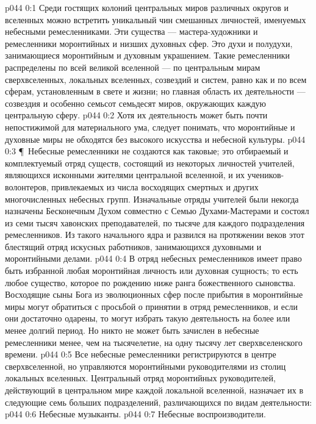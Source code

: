 \author{Архангел}
\vs p044 0:1 Среди гостящих колоний центральных миров различных округов и вселенных можно встретить уникальный чин смешанных личностей, именуемых небесными ремесленниками. Эти существа --- мастера\hyp{}художники и ремесленники моронтийных и низших духовных сфер. Это духи и полудухи, занимающиеся моронтийным и духовным украшением. Такие ремесленники распределены по всей великой вселенной --- по центральным мирам сверхвселенных, локальных вселенных, созвездий и систем, равно как и по всем сферам, установленным в свете и жизни; но главная область их деятельности --- созвездия и особенно семьсот семьдесят миров, окружающих каждую центральную сферу.
\vs p044 0:2 Хотя их деятельность может быть почти непостижимой для материального ума, следует понимать, что моронтийные и духовные миры не обходятся без высокого искусства и небесной культуры.
\vs p044 0:3 \P\ Небесные ремесленники не создаются как таковые; это отбираемый и комплектуемый отряд существ, состоящий из некоторых личностей учителей, являющихся исконными жителями центральной вселенной, и их учеников\hyp{}волонтеров, привлекаемых из числа восходящих смертных и других многочисленных небесных групп. Изначальные отряды учителей были некогда назначены Бесконечным Духом совместно с Семью Духами\hyp{}Мастерами и состоял из семи тысяч хавонских преподавателей, по тысяче для каждого подразделения ремесленников. Из такого начального ядра и развился на протяжении веков этот блестящий отряд искусных работников, занимающихся духовными и моронтийными делами.
\vs p044 0:4 В отряд небесных ремесленников имеет право быть избранной любая моронтийная личность или духовная сущность; то есть любое существо, которое по рождению ниже ранга божественного сыновства. Восходящие сыны Бога из эволюционных сфер после прибытия в моронтийные миры могут обратиться с просьбой о принятии в отряд ремесленников, и если они достаточно одарены, то могут избрать такую деятельность на более или менее долгий период. Но никто не может быть зачислен в небесные ремесленники менее, чем на тысячелетие, на одну тысячу лет сверхвселенского времени.
\vs p044 0:5 Все небесные ремесленники регистрируются в центре сверхвселенной, но управляются моронтийными руководителями из столиц локальных вселенных. Центральный отряд моронтийных руководителей, действующий в центральном мире каждой локальной вселенной, назначает их в следующие семь больших подразделений, различающихся по видам деятельности:
\vs p044 0:6 \bibnobreakspace Небесные музыканты.
\vs p044 0:7 \bibnobreakspace Небесные воспроизводители.
